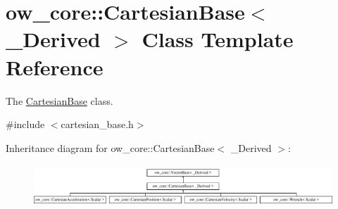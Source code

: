 \hypertarget{classow__core_1_1CartesianBase}{}\section{ow\+\_\+core\+:\+:Cartesian\+Base$<$ \+\_\+\+Derived $>$ Class Template Reference}
\label{classow__core_1_1CartesianBase}


The \hyperlink{classow__core_1_1CartesianBase}{Cartesian\+Base} class.  




{\ttfamily \#include $<$cartesian\+\_\+base.\+h$>$}

Inheritance diagram for ow\+\_\+core\+:\+:Cartesian\+Base$<$ \+\_\+\+Derived $>$\+:\begin{figure}[H]
\begin{center}
\leavevmode
\includegraphics[height=1.603053cm]{de/d13/classow__core_1_1CartesianBase}
\end{center}
\end{figure}
